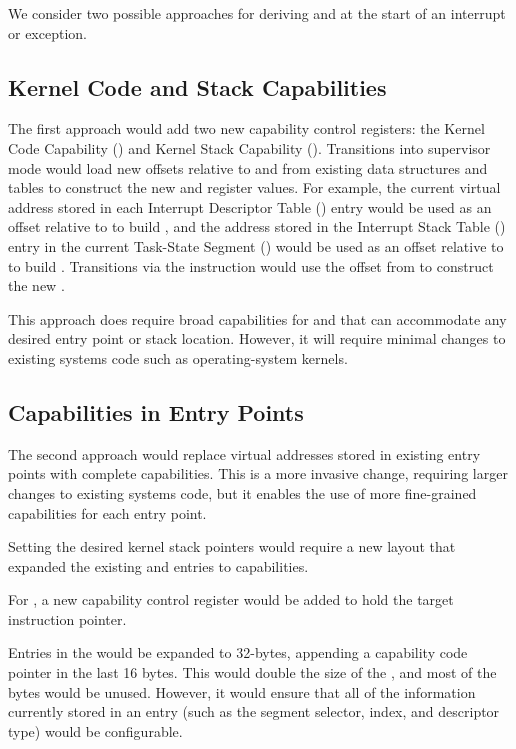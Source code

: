 We consider two possible approaches for deriving \CIP{} and \CSP{} at
the start of an interrupt or exception.

\subsection{Kernel Code and Stack Capabilities}

The first approach would add two new capability control registers: the Kernel
Code Capability (\KCC{}) and Kernel Stack Capability (\KSC{}).  Transitions into
supervisor mode would load new offsets relative to \KCC{} and \KSC{} from
existing data structures and tables to construct the new \CIP{} and \CSP{}
register values.  For example, the current virtual address stored in
each Interrupt Descriptor Table (\IDT{}) entry would be used as an offset
relative to \KCC{} to build \CIP{}, and the address stored in the Interrupt
Stack Table (\IST{}) entry in the current Task-State Segment (\TSS{}) would
be used as an offset relative to \KSC{} to build \CSP{}.  Transitions via
the  instruction would use the offset from \LSTAR{} to
construct the new \CIP{}.

This approach does require broad capabilities
for \KCC{} and \KSC{} that can accommodate any desired entry point or stack
location.  However, it will require minimal changes to existing systems
code such as operating-system kernels.

\subsection{Capabilities in Entry Points}

The second approach would replace virtual addresses stored in
existing entry points with complete capabilities.  This is a more
invasive change, requiring larger changes to existing systems code, but
it enables the use of more fine-grained capabilities for each entry
point.

Setting the desired kernel stack pointers \CSP{} would require a new
\TSS{} layout that expanded the existing \RSP{} and \IST{} entries to
capabilities.

For , a new capability control register \CSTAR{} would be
added to hold the target instruction pointer.

Entries in the \IDT{} would be expanded to 32-bytes, appending a capability
code pointer in the last 16 bytes.  This would double the size of the
\IDT{}, and most of the bytes would be unused.  However, it would
ensure that all of the information currently stored in an \IDT{} entry
(such as the segment selector, \IST{} index, and descriptor type) would
be configurable.

